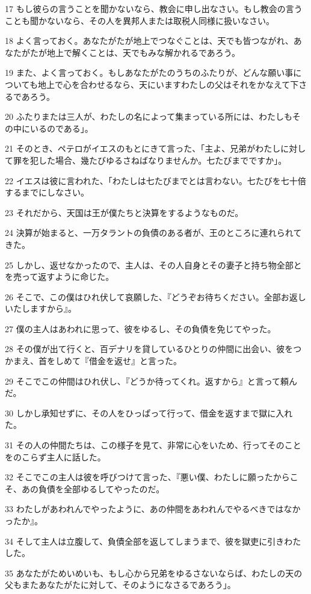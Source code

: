 \par 17 もし彼らの言うことを聞かないなら、教会に申し出なさい。もし教会の言うことも聞かないなら、その人を異邦人または取税人同様に扱いなさい。
\par 18 よく言っておく。あなたがたが地上でつなぐことは、天でも皆つながれ、あなたがたが地上で解くことは、天でもみな解かれるであろう。
\par 19 また、よく言っておく。もしあなたがたのうちのふたりが、どんな願い事についても地上で心を合わせるなら、天にいますわたしの父はそれをかなえて下さるであろう。
\par 20 ふたりまたは三人が、わたしの名によって集まっている所には、わたしもその中にいるのである」。
\par 21 そのとき、ペテロがイエスのもとにきて言った、「主よ、兄弟がわたしに対して罪を犯した場合、幾たびゆるさねばなりませんか。七たびまでですか」。
\par 22 イエスは彼に言われた、「わたしは七たびまでとは言わない。七たびを七十倍するまでにしなさい。
\par 23 それだから、天国は王が僕たちと決算をするようなものだ。
\par 24 決算が始まると、一万タラントの負債のある者が、王のところに連れられてきた。
\par 25 しかし、返せなかったので、主人は、その人自身とその妻子と持ち物全部とを売って返すように命じた。
\par 26 そこで、この僕はひれ伏して哀願した、『どうぞお待ちください。全部お返しいたしますから』。
\par 27 僕の主人はあわれに思って、彼をゆるし、その負債を免じてやった。
\par 28 その僕が出て行くと、百デナリを貸しているひとりの仲間に出会い、彼をつかまえ、首をしめて『借金を返せ』と言った。
\par 29 そこでこの仲間はひれ伏し、『どうか待ってくれ。返すから』と言って頼んだ。
\par 30 しかし承知せずに、その人をひっぱって行って、借金を返すまで獄に入れた。
\par 31 その人の仲間たちは、この様子を見て、非常に心をいため、行ってそのことをのこらず主人に話した。
\par 32 そこでこの主人は彼を呼びつけて言った、『悪い僕、わたしに願ったからこそ、あの負債を全部ゆるしてやったのだ。
\par 33 わたしがあわれんでやったように、あの仲間をあわれんでやるべきではなかったか』。
\par 34 そして主人は立腹して、負債全部を返してしまうまで、彼を獄吏に引きわたした。
\par 35 あなたがためいめいも、もし心から兄弟をゆるさないならば、わたしの天の父もまたあなたがたに対して、そのようになさるであろう」。

